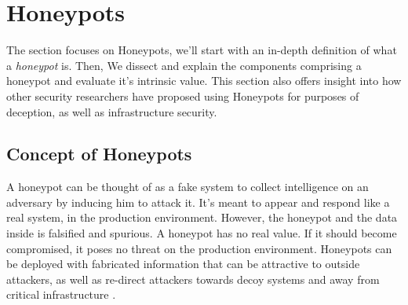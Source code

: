 \documentclass[grad,lot,lof,11pt,oneside,onehalfspace]{RUthesis}
\begin{document}
\newpage
\section{Honeypots}
The section focuses on Honeypots, we'll start with an in-depth definition of what a \textit{honeypot} is. Then, We dissect and explain the components comprising a honeypot and evaluate it's intrinsic value. This section also offers insight into how other security researchers have proposed using Honeypots for purposes of deception, as well as infrastructure security. 
\subsection{Concept of Honeypots}
A honeypot can be thought of as a fake system to collect intelligence on an adversary by inducing him to attack it. It's meant to appear and respond like a real system, in the production environment. However, the honeypot and the data inside is falsified and spurious. A honeypot has no real value. If it should become compromised, it poses no threat on the production environment\cite{lihet_how_2015}\cite{suo_research_2014}. Honeypots can be deployed with fabricated information that can be attractive to outside attackers, as well as re-direct attackers towards decoy systems and away from critical infrastructure \cite{guarnizo_siphon:_2017}.
\end{document}
